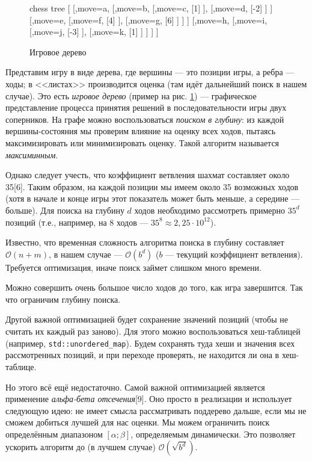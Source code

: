 {   	\begin{figure}[h]
   		\centering
   		\caption{Игровое дерево}
   		\label{fig: tree1}
   		
   		\begin{forest}chess tree
   			[
   			[,move=a,
   			[,move=b,
   			[,move=c,
   			[1]
   			],
   			[,move=d,
   			[-2]
   			]
   			]
   			[,move=e,
   			[,move=f,
   			[4]
   			],
   			[,move=g,
   			[6]
   			]
   			]
   			]
   			[,move=h,
   			[,move=i,
   			[,move=j,
   			[-3]
   			],
   			[,move=k,
   			[1]
   			]
   			]	
   			]
   			]
   		\end{forest}
   	\end{figure}
   	
   	Представим игру в виде дерева, где вершины --- это позиции игры, а ребра --- ходы; в <<листах>> производится оценка (там идёт дальнейший поиск в нашем случае). Это есть \textit{игровое дерево} (пример на рис. \ref{fig: tree1}) --- графическое представление процесса принятия решений в последовательности игры двух соперников. На графе можно воспользоваться \textit{поиском в глубину}: из каждой вершины-состояния мы проверим влияние на оценку всех ходов, пытаясь максимизировать или минимизировать оценку. Такой алгоритм называется \textit{максиминным}. 
   	
	
	Однако следует учесть, что коэффициент ветвления шахмат составляет около 35[6]. Таким образом, на каждой позиции мы имеем около 35 возможных ходов (хотя в начале и конце игры этот показатель может быть меньше, а середине --- больше). Для поиска на глубину $d$ ходов необходимо рассмотреть примерно $35^{d}$ позиций (т.е., например, на $8$ ходов --- $35^{8} \approx 2,25\cdot10^{12}$).
	
	Известно, что временная сложность алгоритма поиска в глубину составляет $\mathcal{O}(n+m)$, в нашем случае --- $\mathcal{O}(b^{d})$ ($b$ --- текущий коэффициент ветвления). Требуется оптимизация, иначе поиск займет слишком много времени.
	
	Можно совершить очень большое число ходов до того, как игра завершится. Так что ограничим глубину поиска.
	
	Другой важной оптимизацией будет сохранение значений позиций (чтобы не считать их каждый раз заново). Для этого можно воспользоваться хеш-таблицей (например, \texttt{std::unordered\_map}). Будем сохранять туда хеши и значения всех рассмотренных позиций, и при переходе проверять, не находится ли она в хеш-таблице.
	
	Но этого всё ещё недостаточно. Самой важной оптимизацией является применение \textit{альфа-бета отсечения}[9]. Оно просто в реализации и использует следующую идею: не имеет смысла рассматривать поддерево дальше, если мы не сможем добиться лучшей для нас оценки. Мы можем ограничить поиск определённым диапазоном $[\alpha;\beta]$, определяемым динамически. Это позволяет ускорить алгоритм до (в лучшем случае) $\mathcal{O}(\sqrt{b^{d}})$.
	
}
